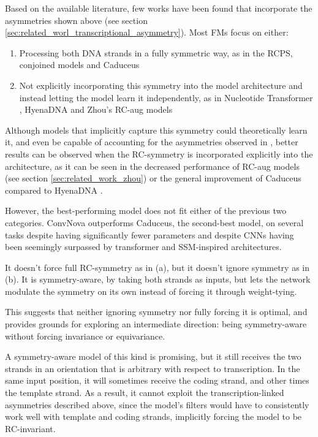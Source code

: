 \documentclass[   ]{article}
\begin{document}
Based on the available literature, few works have been found that incorporate the asymmetries shown above (see section \ref{sec:related_worl_transcriptional_asymmetry}). Most FMs focus on either:
\begin{enumerate}[label=\alph*]
	\item Processing both DNA strands in
	a fully symmetric way, as in the RCPS, conjoined models
	\citep{zhouBetterUnderstandingReverseComplement2021} and Caduceus
	\citep{schiffCaduceusBiDirectionalEquivariant2024}
	\item Not explicitly incorporating this symmetry into the model architecture and instead letting the model learn it independently, as in Nucleotide Transformer
	\citep{dalla-torreNucleotideTransformerBuilding2025}, HyenaDNA
	\citep{nguyenHyenaDNALongRangeGenomic2023} and Zhou's RC-aug models
	\citep{zhouBetterUnderstandingReverseComplement2021}
\end{enumerate}

Although models that implicitly capture this symmetry could
theoretically learn it, and even be capable of accounting for the
asymmetries observed in \citet{moeckelStrandAsymmetriesGenomic2023}, better results can be observed when
the RC-symmetry is incorporated explicitly into the architecture, as it can be seen in
the decreased performance of \citet{zhouBetterUnderstandingReverseComplement2021} RC-aug models (see section \ref{sec:related_work_zhou}) or the general
improvement of Caduceus compared to HyenaDNA
\citep{schiffCaduceusBiDirectionalEquivariant2024}.

However, the best-performing model does not fit either of the previous two categories. ConvNova outperforms Caduceus, the second-best model, on several tasks despite having significantly fewer parameters\citep{boRevisitingConvolutionArchitecture2025} and despite CNNs having been seemingly surpassed by transformer and SSM-inspired architectures. 

It doesn't force full RC-symmetry as in (a), but it doesn't ignore symmetry as in (b). It is symmetry-aware, by taking both strands as inputs, but lets the network modulate the symmetry on its own instead of forcing it through weight-tying.

This
suggests that neither ignoring symmetry nor fully forcing it is optimal, and provides grounds for exploring an intermediate direction: being symmetry-aware without forcing invariance or equivariance.

A symmetry-aware model of this kind is promising, but it still receives the two strands in an orientation that is arbitrary with respect to transcription. In the same input position, it will sometimes receive the coding strand, and other times the template strand. As a result, it cannot exploit the transcription-linked asymmetries described above, since the model's filters would have to consistently work well with template and coding strands, implicitly forcing the model to be RC-invariant.
\end{document}
